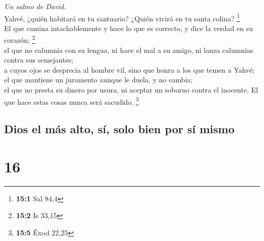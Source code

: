 \emph{Un salmo de David.}\\
 Yahvé, ¿quién habitará en tu santuario? ¿Quién vivirá en
tu santa colina? \footnote{\textbf{15:1} Sal 84,4}\\
 El que camina intachablemente y hace lo que es correcto,
y dice la verdad en su corazón; \footnote{\textbf{15:2} Is 33,15}\\
 el que no calumnia con su lengua, ni hace el mal a su
amigo, ni lanza calumnias contra sus semejantes;\\
 a cuyos ojos se desprecia al hombre vil, sino que honra a
los que temen a Yahvé; el que mantiene un juramento aunque le duela, y
no cambia;\\
 el que no presta su dinero por usura, ni aceptar un
soborno contra el inocente. El que hace estas cosas nunca será sacudido.
\footnote{\textbf{15:5} Éxod 22,25}

\hypertarget{dios-el-muxe1s-alto-suxed-solo-bien-por-suxed-mismo}{%
\subsection{Dios el más alto, sí, solo bien por sí
mismo}\label{dios-el-muxe1s-alto-suxed-solo-bien-por-suxed-mismo}}

\hypertarget{section-15}{%
\section{16}\label{section-15}}

